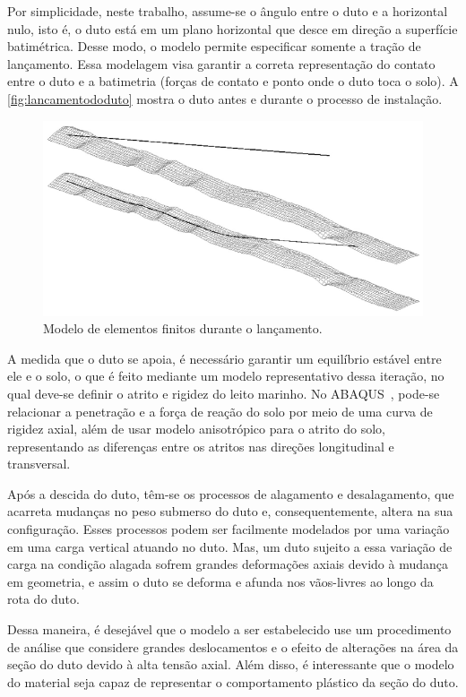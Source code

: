 Por simplicidade, neste trabalho, assume-se o ângulo entre o duto e a horizontal nulo, isto é, o duto está em um plano horizontal que desce em direção a superfície batimétrica.
Desse modo, o modelo permite especificar somente a tração de lançamento.
Essa modelagem visa garantir a correta representação do contato entre o duto e a batimetria (forças de contato e ponto onde o duto toca o solo).
A \autoref{fig:lancamentododuto} mostra o duto antes e durante o processo de instalação.

\begin{figure}[!ht]
    \centering
    \caption{Modelo de elementos finitos durante o lançamento.}\label{fig:lancamentododuto}
    \includegraphics[width=0.7\linewidth]{imagens/lancamento_do_duto}
\end{figure}

A medida que o duto se apoia, é necessário garantir um equilíbrio estável entre ele e o solo, o que é feito mediante um modelo representativo dessa iteração, no qual deve-se definir o atrito e rigidez do leito marinho.
No ABAQUS~\cite{Dassault2018}, pode-se relacionar a penetração e a força de reação do solo por meio de uma curva de rigidez axial, além de usar modelo anisotrópico para o atrito do solo, representando as diferenças entre os atritos nas direções longitudinal e transversal.

Após a descida do duto, têm-se os processos de alagamento e desalagamento, que acarreta mudanças no peso submerso do duto e, consequentemente, altera na sua configuração.
Esses processos podem ser facilmente modelados por uma variação em uma carga vertical atuando no duto.
Mas, um duto sujeito a essa variação de carga na condição alagada sofrem grandes deformações axiais devido à mudança em geometria, e assim o duto se deforma e afunda nos vãos-livres ao longo da rota do duto.

Dessa maneira, é desejável que o modelo a ser estabelecido use um procedimento de análise que considere grandes deslocamentos e o efeito de alterações na área da seção do duto devido à alta tensão axial.
Além disso, é interessante que o modelo do material seja capaz de representar o comportamento plástico da seção do duto.

